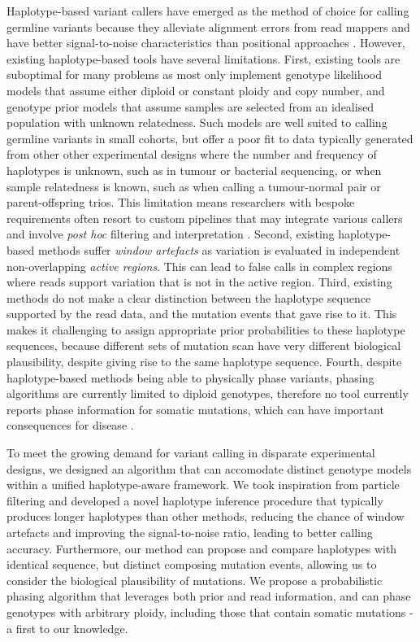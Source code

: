 \documentclass[notitlepage, twocolumn]{article}
\begin{document}
Haplotype-based variant callers have emerged as the method of choice for calling germline variants because they alleviate alignment errors from read mappers and have better signal-to-noise characteristics than positional approaches \cite{RN5, RN604, RN562, RN141, RN538, RN598, RN166}. However, existing haplotype-based tools have several limitations. First, existing tools are suboptimal for many problems as most only implement genotype likelihood models that assume either diploid \cite{RN5, RN604, RN562} or constant \cite{RN141, RN538, RN598} ploidy and copy number, and genotype prior models that assume samples are selected from an idealised population with unknown relatedness. Such models are well suited to calling germline variants in small cohorts, but offer a poor fit to data typically generated from other other experimental designs where the number and frequency of haplotypes is unknown, such as in tumour or bacterial sequencing, or when sample relatedness is known, such as when calling a tumour-normal pair or parent-offspring trios. This limitation means researchers with bespoke requirements often resort to custom pipelines that may integrate various callers and involve \textit{post hoc} filtering and interpretation \cite{RN156, RN361, RN373, RN276, RN3, RN514, RN541, RN540}. Second, existing haplotype-based methods suffer \emph{window artefacts} as variation is evaluated in independent non-overlapping \emph{active regions}. This can lead to false calls in complex regions where reads support variation that is not in the active region. Third, existing methods do not make a clear distinction between the haplotype sequence supported by the read data, and the mutation events that gave rise to it. This makes it challenging to assign appropriate prior probabilities to these haplotype sequences, because different sets of mutation scan have very different biological plausibility, despite giving rise to the same haplotype sequence. Fourth, despite haplotype-based methods being able to physically phase variants, phasing algorithms are currently limited to diploid genotypes, therefore no tool currently reports phase information for somatic mutations, which can have important consequences for disease \cite{RN211}.

To meet the growing demand for variant calling in disparate experimental designs, we designed an algorithm that can accomodate distinct genotype models within a unified haplotype-aware framework. We took inspiration from particle filtering \cite{Doucet11atutorial} and developed a novel haplotype inference procedure that typically produces longer haplotypes than other methods, reducing the chance of window artefacts and improving the signal-to-noise ratio, leading to better calling accuracy. Furthermore, our method can propose and compare haplotypes with identical sequence, but distinct composing mutation events, allowing us to consider the biological plausibility of mutations. We propose a probabilistic phasing algorithm that leverages both prior and read information, and can phase genotypes with arbitrary ploidy, including those that contain somatic mutations - a first to our knowledge. 
\end{document}
